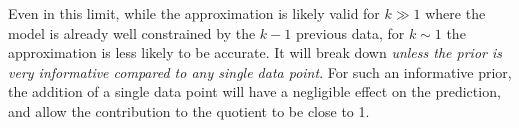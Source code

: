 \documentclass[12pt]{article}
\begin{document}
Even in this limit, while the approximation is likely valid for $k \gg 1$
where the model is already well constrained by the $k-1$ previous data,
for $k \sim 1$ the approximation is less likely to be accurate.
It will break down
{\it unless the prior is very informative compared to any single data point}.
For such an informative prior, the addition of a single data point will
have a negligible effect on the prediction, and allow the contribution to the
quotient to be close to 1.
\end{document}
